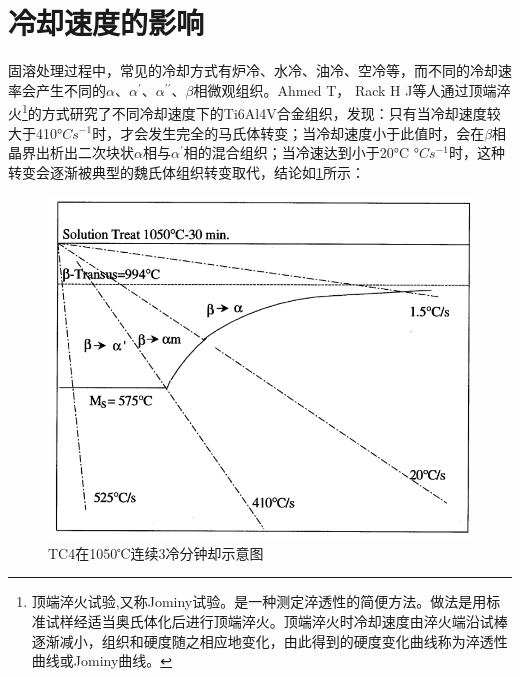 \documentclass[
class = book,
zihao = -4,
font = noto,
paper = a4paper,
openany
]{easybook}
\newcommand{\ti}{Ti6Al4V}
\begin{document}
\section{冷却速度的影响}
固溶处理过程中，常见的冷却方式有炉冷、水冷、油冷、空冷等，而不同的冷却速率会产生不同的$ \alpha  $、$ \alpha  ^{\prime}$、$ \alpha  ^{\prime\prime}$、$ \beta$相微观组织\cite{malinovModellingCorrelationProcessing2001}。Ahmed T， Rack H J等人通过顶端淬火\footnote{顶端淬火试验,又称Jominy试验。是一种测定淬透性的简便方法。做法是用标准试样经适当奥氏体化后进行顶端淬火。顶端淬火时冷却速度由淬火端沿试棒逐渐减小，组织和硬度随之相应地变化，由此得到的硬度变化曲线称为淬透性曲线或Jominy曲线。}的方式研究\cite{ahmedPhaseTransformationsCooling1998}了不同冷却速度下的\ti 合金组织，发现：只有当冷却速度较大于410°$C  s^{- 1} $时，才会发生完全的马氏体转变；当冷却速度小于此值时，会在$ \beta $相晶界出析出二次块状$\alpha  $相与$ \alpha^{\prime} $相的混合组织；当冷速达到小于20°C °$C  s^{- 1} $时，这种转变会逐渐被典型的魏氏体组织转变取代，结论如\ref{fig:tc41050c3}所示：
\begin{figure}[h!]
	\centering
	\includegraphics[width=0.7\linewidth]{TC4在1050℃连续3冷分钟却示意图}
	\caption{TC4在1050℃连续3冷分钟却示意图}
	\label{fig:tc41050c3}
\end{figure}
\end{document}

